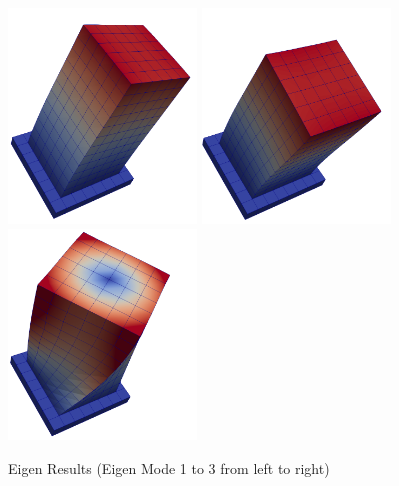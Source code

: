 \begin{figure}[H]
  \centering
  \includegraphics[width = 5cm]{./Figure-files/nonlinear_analysis_steps/structure/eigen/eigen1.png}
  \includegraphics[width = 5cm]{./Figure-files/nonlinear_analysis_steps/structure/eigen/eigen2.png}
  \includegraphics[width = 5cm]{./Figure-files/nonlinear_analysis_steps/structure/eigen/eigen3.png}
  \caption{Eigen Results (Eigen Mode 1 to 3 from left to right)}
  \label{fig_eigen_results_1}
\end{figure}


